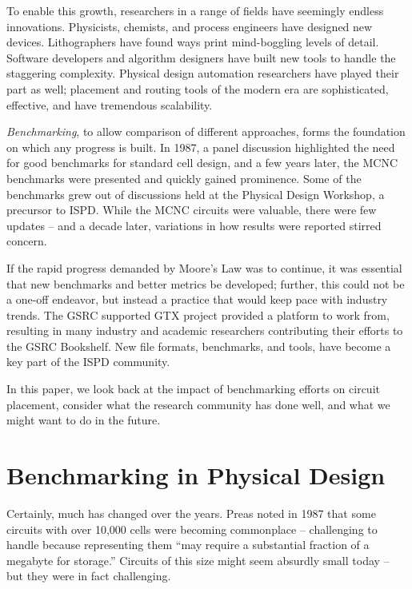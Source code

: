 \documentclass[sigconf]{acmart}
\begin{document}
To enable this growth, researchers in a range of fields have
seemingly endless innovations.  Physicists,
chemists, and process engineers have designed new devices. Lithographers
have found ways print mind-boggling levels of detail. Software developers
and algorithm designers have built new tools to handle the staggering
complexity. 
Physical design automation researchers have played their part as well;
placement and routing tools of the modern era are sophisticated, effective,
and have tremendous scalability.

{\em Benchmarking}, to allow comparison of different approaches,
forms the foundation on which any progress is built.
In 1987, a panel discussion\cite{Preas87}
highlighted the need for good benchmarks for standard cell
design, and a few years later, the MCNC benchmarks\cite{Kozminski91}
were presented and quickly gained prominence.  Some of the benchmarks
grew out of discussions held at the Physical Design Workshop,
a precursor to ISPD.
While the
MCNC circuits were valuable, there were few updates -- and a
decade later, variations in how results were reported
stirred concern\cite{Madden010030}.

If the rapid progress demanded by Moore's Law was to continue, it
was essential that new benchmarks and better metrics be developed;
further, this could not be a one-off endeavor, but instead a
practice that would keep pace with industry trends.  The
GSRC supported GTX project
\cite{Caldwell000693} provided a platform to work from,
resulting in many industry and academic researchers
contributing their efforts to the GSRC Bookshelf\cite{umichbookshelf}.
New file formats, benchmarks, and tools, have become
a key part of the ISPD community.

In this paper, we look back at the impact of benchmarking
efforts on circuit placement, consider what the research
community has done well, and what
we might want to do in the future.


\section{Benchmarking in Physical Design}

Certainly, much has changed over the years.  Preas\cite{Preas87}
noted in 1987 that some circuits with over 10,000 cells were becoming
commonplace -- challenging to handle because representing them
``may require a substantial fraction of a megabyte for storage.''
Circuits of this size might seem absurdly small today -- but they
were in fact challenging.
\end{document}
